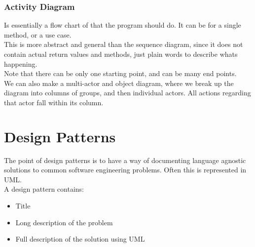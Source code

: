 \documentclass[12pt]{article}
\theoremstyle{definition}
\begin{document}
\section{Activity Diagram}
Is essentially a flow chart of that the program should do. It can be for a single method, or a use case.
\\ \linebreak
This is more abstract and general than the sequence diagram, since it does not contain actual return values and methods, just plain words to describe whats happening.
\\ \linebreak
Note that there can be only one starting point, and can be many end points. 
\\ \linebreak
We can also make a multi-actor and object diagram, where we break up the diagram into columns of groups, and then individual actors. All actions regarding that actor fall within its column.

\part{Design Patterns}
The point of design patterns is to have a way of documenting language agnostic solutions to common software engineering problems. Often this is represented in UML.
\\ \linebreak
A design pattern contains:
\begin{itemize}
	\item Title
	\item Long description of the problem
	\item Full description of the solution using UML
\end{itemize}
\end{document}

